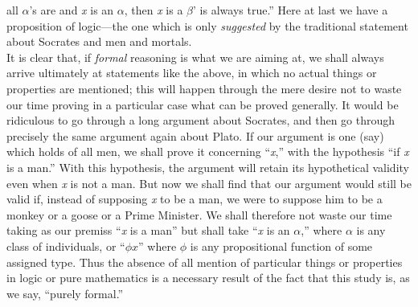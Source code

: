 {all \ensuremath{\alpha}'s are \label{change:betas} and \textit{x}
is an \ensuremath{\alpha}, then \textit{x}
is a \ensuremath{\beta}' is always true.'' Here at
last we have a proposition of logic---the one which is only \textit{suggested} by
the traditional statement about Socrates and men and mortals.\\
\indent It is clear that, if \textit{formal}
reasoning is
what we are aiming
at, we
shall always arrive ultimately at statements like the above, in which
no actual things or properties are mentioned; this will happen through
the mere desire not to waste our time proving in a particular case what
can be proved generally. It would be ridiculous to go through a long
argument about Socrates, and then go through precisely the same
argument again about Plato. If our argument is one (say) which holds of
all men, we shall prove it concerning ``\textit{x},'' with the
hypothesis ``if \textit{x}
is
a man.'' With   this
hypothesis, the argument will retain its hypothetical
validity even when \textit{x}
is not a man. But now we shall find that our argument would still be
valid if, instead of supposing \textit{x}
to be a man, we
were to suppose him to be a monkey or a goose or a Prime Minister. We
shall therefore not waste our time taking as our premiss ``\textit{x} is a man''
but shall take ``\textit{x}
is an \ensuremath{\alpha},'' where \ensuremath{\alpha} is any class of individuals, or
``$\phi x$'' where
\ensuremath{\phi} is any propositional function of some
assigned type. Thus the absence of all mention of particular things or
properties in logic or pure mathematics is a necessary result of the
fact that this study is, as we say, ``purely formal.''}
